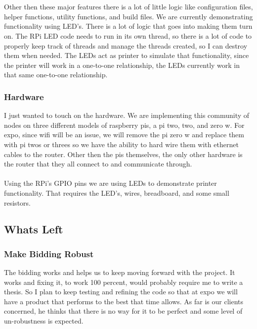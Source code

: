 \documentclass[draftclsnofoot, onecolumn, compsoc, 10pt]{IEEEtran}
\begin{document}
\\ \\
Other then these major features there is a lot of little logic like configuration files, helper functions, utility functions, and build files. We are currently demonstrating functionality using LED's. There is a lot of logic that goes into making them turn on. The RPi LED code needs to run in its own thread, so there is a lot of code to properly keep track of threads and manage the threads created, so I can destroy them when needed. The LEDs act as printer to simulate that functionality, since the printer will work in a one-to-one relationship, the LEDs currently work in that same one-to-one relationship.

\subsubsection{Hardware}
I just wanted to touch on the hardware. We are implementing this community of nodes on three different models of raspberry pis, a pi two, two, and zero w. For expo, since wifi will be an issue, we will remove the pi zero w and replace them with pi twos or threes so we have the ability to hard wire them with ethernet cables to the router. Other then the pis themselves, the only other hardware is the router that they all connect to and communicate through. 
\\ \\
Using the RPi's GPIO pins we are using LEDs to demonstrate printer functionality. That requires the LED's, wires, breadboard, and some small resistors.

\subsection{Whats Left}
\subsubsection{Make Bidding Robust}
 The bidding works and helps us to keep moving forward with the project. It works and fixing it, to work 100 percent, would probably require me to write a thesis. So I plan to keep testing and refining the code so that at expo we will have a product that performs to the best that time allows. As far is our clients concerned, he thinks that there is no way for it to be perfect and some level of un-robustness is expected.
\end{document}

